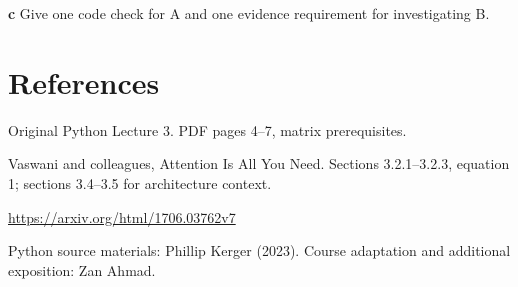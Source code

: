 \documentclass[11pt,letterpaper]{article}
\theoremstyle{definition}\newtheorem{definition}{Definition}\newtheorem{example}{Example}
\numberwithin{equation}{section}
\begin{document}
\textbf{c} Give one code check for A and one evidence requirement for investigating B.

\section*{References}
\noindent\begin{minipage}{\linewidth}
Original Python Lecture 3. PDF pages 4--7, matrix prerequisites.

\end{minipage}\par\medskip
\noindent\begin{minipage}{\linewidth}
Vaswani and colleagues, Attention Is All You Need. Sections 3.2.1--3.2.3, equation 1; sections 3.4--3.5 for architecture context.

\url{https://arxiv.org/html/1706.03762v7}
\end{minipage}\par\medskip
Python source materials: Phillip Kerger (2023). Course adaptation and additional exposition: Zan Ahmad.
\end{document}
